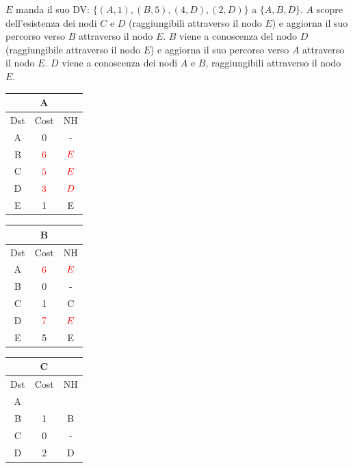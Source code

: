 \documentclass[10pt]{article}
\begin{document}
	\newline \newline \newline \newline
	$E$ manda il suo DV: $\{(A,1),(B,5),(4,D),(2,D)\}$ a $\{A,B,D\}$.
	\newline
	$A$ scopre dell'esistenza dei nodi $C$ e $D$ (raggiungibili attraverso il nodo $E$) e aggiorna il suo percorso verso $B$ attraverso il nodo $E$.
	\newline
	$B$ viene a conoscenza del nodo $D$ (raggiungibile attraverso il nodo $E$) e aggiorna il suo percorso verso $A$ attraverso il nodo $E$.
	\newline
	$D$ viene a conoscenza dei nodi $A$ e $B$, raggiungibili attraverso il nodo $E$.
	\begin{table}[h!]
		\begin{tabular}{|c||c||c|}
 			\hline
	 		\multicolumn{3}{|c|}{A} \\
 			\hline
 			Dst & Cost & NH\\
 			\hline
 			A & 0 & - \\
 			B & $\color{red} 6$  & $\color{red} E$ \\
 			C & $\color{red} 5$  & $\color{red} E$  \\
 			D & $\color{red} 3$  & $\color{red} D$ \\
 			E & 1 & E \\
 			\hline
		\end{tabular}
		\begin{tabular}{|c||c||c|}
 			\hline
	 		\multicolumn{3}{|c|}{B} \\
 			\hline
 			Dst & Cost & NH\\
 			\hline
 			A & $\color{red} 6$  & $\color{red} E$ \\
 			B & 0 & - \\
 			C & 1 & C  \\
 			D & $\color{red} 7$  & $\color{red} E$ \\
 			E & 5 & E \\
 			\hline
		\end{tabular}
		\begin{tabular}{|c||c||c|}
 			\hline
	 		\multicolumn{3}{|c|}{C} \\
 			\hline
 			Dst & Cost & NH\\
 			\hline
 			A &   &   \\
 			B & 1 & B \\
 			C & 0 & - \\
 			D & 2 & D \\

\end{tabular}
\end{table}
\end{document}
